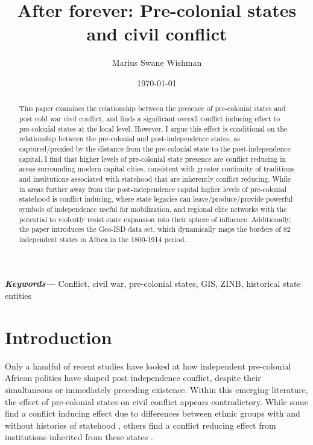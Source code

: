 \documentclass[12pt]{article}
\title{After forever: Pre-colonial states and civil conflict}
\author[1]{Marius Swane Wishman}
\affil[1]{Department of Sociology and Political Science, NTNU}
\date{\today}
\providecommand{\keywords}[1]
{
	\small	
	\textbf{\textit{Keywords---}} #1
}
\begin{document}
\maketitle

\begin{abstract}

This paper examines the relationship between the presence of pre-colonial states
and post cold war civil conflict, and finds a significant overall conflict
inducing effect to pre-colonial states at the local level. However, I argue this
effect is conditional on the relationship between the pre-colonial and
post-independence states, as captured/proxied by the distance from the pre-colonial
state to the post-independence capital. I find that higher levels of pre-colonial
state presence are conflict reducing in areas surrounding modern capital cities,
consistent with greater continuity of traditions and institutions associated
with statehood that are inherently conflict reducing. While in areas further
away from the post-independence capital higher levels of pre-colonial statehood is
conflict inducing, where state legacies can leave/produce/provide powerful
symbols of independence useful for mobilization, and regional elite networks
with the potential to violently resist state expansion into their sphere of
influence. Additionally, the paper introduces the Geo-ISD data set, which
dynamically maps the borders of 82 independent states in Africa in the 1800-1914
period. 

\end{abstract}

\keywords{Conflict, civil war, pre-colonial states, GIS, ZINB, historical state
entities}


\onehalfspacing


\newpage

\section{Introduction} \label{Introduction}

Only a handful of recent studies have looked at how independent pre-colonial
African polities have shaped post independence conflict, despite their
simultaneous or immediately preceding existence. Within this emerging
literature, the effect of pre-colonial states on civil conflict appears
contradictory. While some find a conflict inducing effect due to differences
between ethnic groups with and without histories of statehood
\citep{Englebert2002, Paine2019}, others find a conflict reducing effect from
institutions inherited from these states \citep{Depetris-Chauvin2016, Wig2016}.
\end{document}
